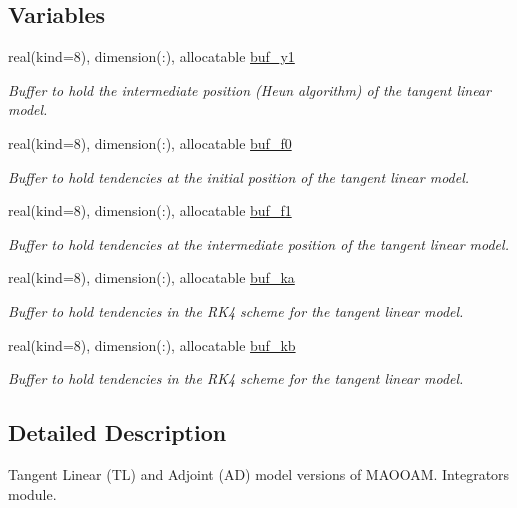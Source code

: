 \subsection*{Variables}
\begin{DoxyCompactItemize}
\item 
real(kind=8), dimension(\+:), allocatable \hyperlink{namespacetl__ad__integrator_a54c26282330477995b554805fbacf236}{buf\+\_\+y1}
\begin{DoxyCompactList}\small\item\em Buffer to hold the intermediate position (Heun algorithm) of the tangent linear model. \end{DoxyCompactList}\item 
real(kind=8), dimension(\+:), allocatable \hyperlink{namespacetl__ad__integrator_ad0e2f29027e4317cae009ca0c4ad1b5a}{buf\+\_\+f0}
\begin{DoxyCompactList}\small\item\em Buffer to hold tendencies at the initial position of the tangent linear model. \end{DoxyCompactList}\item 
real(kind=8), dimension(\+:), allocatable \hyperlink{namespacetl__ad__integrator_ac466cd6f698dc9fed5fc3ab46f30b9a5}{buf\+\_\+f1}
\begin{DoxyCompactList}\small\item\em Buffer to hold tendencies at the intermediate position of the tangent linear model. \end{DoxyCompactList}\item 
real(kind=8), dimension(\+:), allocatable \hyperlink{namespacetl__ad__integrator_a879cc86c1e268775237b6776a4ff7d32}{buf\+\_\+ka}
\begin{DoxyCompactList}\small\item\em Buffer to hold tendencies in the R\+K4 scheme for the tangent linear model. \end{DoxyCompactList}\item 
real(kind=8), dimension(\+:), allocatable \hyperlink{namespacetl__ad__integrator_abd6a1c209bc0120ea4e1e473e067a902}{buf\+\_\+kb}
\begin{DoxyCompactList}\small\item\em Buffer to hold tendencies in the R\+K4 scheme for the tangent linear model. \end{DoxyCompactList}\end{DoxyCompactItemize}


\subsection{Detailed Description}
Tangent Linear (TL) and Adjoint (AD) model versions of M\+A\+O\+O\+AM. Integrators module. 

